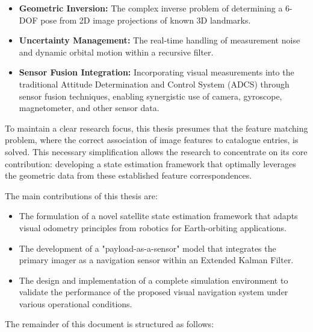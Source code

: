 \begin{itemize}
    \item \textbf{Geometric Inversion:} The complex inverse problem of determining a 6-DOF pose from 2D image projections of known 3D landmarks.
    \item \textbf{Uncertainty Management:} The real-time handling of measurement noise and dynamic orbital motion within a recursive filter.
    \item \textbf{Sensor Fusion Integration:} Incorporating visual measurements into the traditional Attitude Determination and Control System (ADCS) through sensor 
    fusion techniques, enabling synergistic use of camera, gyroscope, magnetometer, and other sensor data.
\end{itemize}
\vspace{0.5cm}

\noindent
To maintain a clear research focus, this thesis presumes that the feature matching problem, where the correct association of image features to catalogue entries, is solved. 
This necessary simplification allows the research to concentrate on its core contribution: developing a state estimation framework that optimally leverages the geometric 
data from these established feature correspondences.

\label{sec:contributions_outline}

\noindent
The main contributions of this thesis are:
\begin{itemize}
    \itemsep0em
    \item The formulation of a novel satellite state estimation framework that adapts visual odometry principles from robotics for Earth-orbiting applications.
    \item The development of a "payload-as-a-sensor" model that integrates the primary imager as a navigation sensor within an Extended Kalman Filter.
    \item The design and implementation of a complete simulation environment to validate the performance of the proposed visual navigation system under various operational conditions.
\end{itemize}

\noindent
The remainder of this document is structured as follows:
\vspace{0.5cm}

